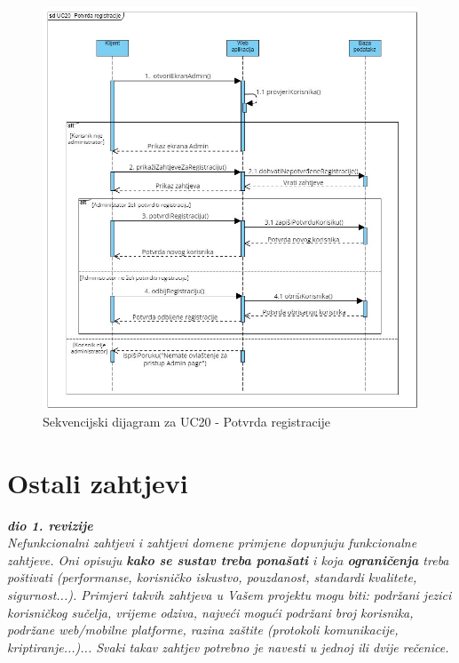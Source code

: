                 \begin{figure}[H] \includegraphics[width=\linewidth]{./dijagrami/PotvrdaRegistracije.jpg}
				    \caption{Sekvencijski dijagram za UC20 - Potvrda registracije}
				    \end{figure}
            \eject
	
		\section{Ostali zahtjevi}
		
			\textbf{\textit{dio 1. revizije}}\\
		 
			 \textit{Nefunkcionalni zahtjevi i zahtjevi domene primjene dopunjuju funkcionalne zahtjeve. Oni opisuju \textbf{kako se sustav treba ponašati} i koja \textbf{ograničenja} treba poštivati (performanse, korisničko iskustvo, pouzdanost, standardi kvalitete, sigurnost...). Primjeri takvih zahtjeva u Vašem projektu mogu biti: podržani jezici korisničkog sučelja, vrijeme odziva, najveći mogući podržani broj korisnika, podržane web/mobilne platforme, razina zaštite (protokoli komunikacije, kriptiranje...)... Svaki takav zahtjev potrebno je navesti u jednoj ili dvije rečenice.}
			 
